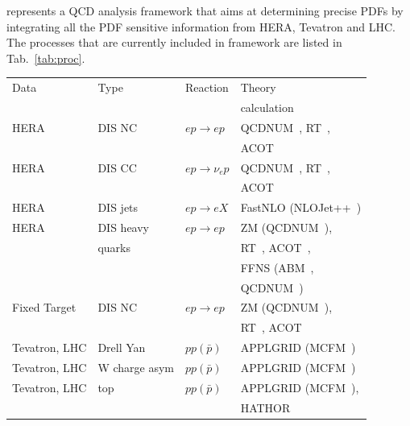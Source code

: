 \fitter represents a QCD analysis framework that aims at 
determining precise PDFs by integrating all the PDF sensitive information
from HERA, Tevatron and LHC.
%
The processes that are currently included in \fitter framework are listed in Tab.~\ref{tab:proc}.
%
\begin{table}
\small
\scriptsize

\begin{tabular}{|l|l|l|l|}
\hline
Data &Type &  Reaction & Theory      \\
        &     &     & calculation \\
\hline

HERA &DIS NC   &$ep\to ep$      & QCDNUM~\cite{qcdnum}, RT~\cite{Thorne:1997ga,Thorne:2006qt,MSTWpdf,Thorne:6180}, \\
     &         &                & ACOT~\cite{CWZ} \\
HERA &DIS CC   &$ep\to \nu_e p$ & QCDNUM~\cite{qcdnum}, RT~\cite{Thorne:1997ga,Thorne:2006qt,MSTWpdf,Thorne:6180}, \\
     &         &                & ACOT~\cite{CWZ} \\
HERA &DIS jets &$ep\to eX$      & FastNLO (NLOJet++~\cite{Nagy:1998bb,Nagy:2001fj})\\
HERA &DIS heavy                 & $ep\to ep $& ZM (QCDNUM~\cite{qcdnum}), \\
     & quarks  &                & RT~\cite{Thorne:1997ga,Thorne:2006qt,MSTWpdf,Thorne:6180}, ACOT~\cite{CWZ}, \\
     &         &                & FFNS (ABM~\cite{Alekhin:runm,openqcdrad:page}, \\
     &         &                & QCDNUM~\cite{qcdnum}) \\
\hline
Fixed Target   &DIS NC          &$ep\to ep$ & ZM (QCDNUM~\cite{qcdnum}), \\
     &         &                & RT~\cite{Thorne:1997ga,Thorne:2006qt,MSTWpdf,Thorne:6180}, ACOT~\cite{CWZ} \\
\hline
Tevatron, LHC &Drell Yan &$pp(\bar p)$ & APPLGRID (MCFM~\cite{Campbell:1999ah,Campbell:2000je,Campbell:2010ff}) \\
Tevatron, LHC &W charge asym &$pp(\bar p)$ & APPLGRID (MCFM~\cite{Campbell:1999ah,Campbell:2000je,Campbell:2010ff}) \\
Tevatron, LHC &top &$pp(\bar p)$  & APPLGRID (MCFM~\cite{Campbell:1999ah,Campbell:2000je,Campbell:2010ff}),  \\
              &    &              & HATHOR~\cite{Aliev:2010zk} \\

\end{tabular}
\end{table}
